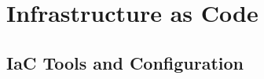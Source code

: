 \section{Infrastructure as Code}
\label{sec:infrastructure-as-code}

\subsection{IaC Tools and Configuration}
\label{subsec:iac-tools-configuration}

